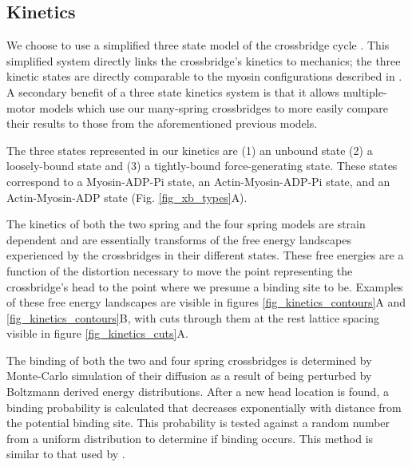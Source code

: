 \documentclass[]{article}
\begin{document}
\subsection*{Kinetics} %
We choose to use a simplified three state model of the crossbridge cycle \citep{Pate:1989:p181, Tanner:2007:pe115}. 
This simplified system directly links the crossbridge's kinetics to mechanics; the three kinetic states are directly comparable to the myosin configurations described in \citet{Houdusse:2000:p11238}.
A secondary benefit of a three state kinetics system is that it allows multiple-motor models which use our many-spring crossbridges to more easily compare their results to those from the aforementioned previous models.

The three states represented in our kinetics are (1) an unbound state (2) a loosely-bound state and (3) a tightly-bound force-generating state.
These states correspond to a Myosin-ADP-Pi state, an Actin-Myosin-ADP-Pi state, and an Actin-Myosin-ADP state (Fig. \ref{fig_xb_types}A).

The kinetics of both the two spring and the four spring models are strain dependent and are essentially transforms of the free energy landscapes experienced by the crossbridges in their different states.
These free energies are a function of the distortion necessary to move the point representing the crossbridge's head to the point where we presume a binding site to be.
Examples of these free energy landscapes are visible in figures \ref{fig_kinetics_contours}A and \ref{fig_kinetics_contours}B, with cuts through them at the rest lattice spacing visible in figure \ref{fig_kinetics_cuts}A.

The binding of both the two and four spring crossbridges is determined by Monte-Carlo simulation of their diffusion as a result of being perturbed by Boltzmann derived energy distributions. 
After a new head location is found, a binding probability is calculated that decreases exponentially with distance from the potential binding site. 
This probability is tested against a random number from a uniform distribution to determine if binding occurs.
This method is similar to that used by \citet{Tanner:2007:pe115}. 
\end{document}

